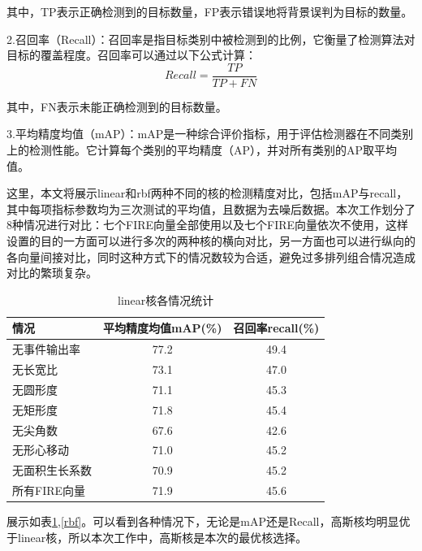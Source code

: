 其中，TP表示正确检测到的目标数量，FP表示错误地将背景误判为目标的数量。

2.召回率（Recall）：召回率是指目标类别中被检测到的比例，它衡量了检测算法对目标的覆盖程度。召回率可以通过以下公式计算：
\begin{equation} 
    Recall=\frac{TP}{TP+FN}
\end{equation}


其中，FN表示未能正确检测到的目标数量。

3.平均精度均值（mAP）：mAP是一种综合评价指标，用于评估检测器在不同类别上的检测性能。它计算每个类别的平均精度（AP），并对所有类别的AP取平均值。

这里，本文将展示linear和rbf两种不同的核的检测精度对比，包括mAP与recall，其中每项指标参数均为三次测试的平均值，且数据为去噪后数据。本次工作划分了8种情况进行对比：七个FIRE向量全部使用以及七个FIRE向量依次不使用，这样设置的目的一方面可以进行多次的两种核的横向对比，另一方面也可以进行纵向的各向量间接对比，同时这种方式下的情况数较为合适，避免过多排列组合情况造成对比的繁琐复杂。

\begin{table}[ht]
    \centering
    \caption{linear核各情况统计}
    \begin{tabularx}{0.7\textwidth}{X|c|c}
        \toprule
        情况&平均精度均值mAP(\%)&召回率recall(\%)\\
        \midrule
        无事件输出率&77.2&49.4\\
        无长宽比&73.1&47.0\\
        无圆形度&71.1&45.3\\
        无矩形度&71.8&45.4\\
        无尖角数&67.6&42.6\\
        无形心移动&71.0&45.2\\
        无面积生长系数&70.9&45.2\\
        所有FIRE向量&71.9&45.6\\
        \bottomrule
    \end{tabularx}
    \label{linear}
\end{table}

展示如表\ref{linear},\ref{rbf}。可以看到各种情况下，无论是mAP还是Recall，高斯核均明显优于linear核，所以本次工作中，高斯核是本次的最优核选择。




